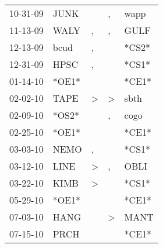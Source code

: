 \begin{supertabular}{p{0.07\textwidth}p{0.06\textwidth}p{0.02\textwidth}p{0.02\textwidth}p{0.06\textwidth}}
          10-31-09\textsuperscript{} &           JUNK\textsuperscript{} &                  &                , &           wapp\textsuperscript{} \\
          11-13-09\textsuperscript{} &           WALY\textsuperscript{} &                , &                , &           GULF\textsuperscript{} \\
          12-13-09\textsuperscript{} &           bcud\textsuperscript{} &                , &                  &                            *CS2* \\
          12-31-09\textsuperscript{} &           HPSC\textsuperscript{} &                , &                  &                            *CS1* \\
          01-14-10\textsuperscript{} &                            *OE1* &                  &                  &                            *CE1* \\
          02-02-10\textsuperscript{} &           TAPE\textsuperscript{} &     \textgreater &     \textgreater &           sbth\textsuperscript{} \\
          02-09-10\textsuperscript{} &                            *OS2* &                  &                , &           cogo\textsuperscript{} \\
          02-25-10\textsuperscript{} &                            *OE1* &                  &                  &                            *CE1* \\
          03-03-10\textsuperscript{} &           NEMO\textsuperscript{} &                , &                  &                            *CS1* \\
          03-12-10\textsuperscript{} &           LINE\textsuperscript{} &     \textgreater &                , &           OBLI\textsuperscript{} \\
          03-22-10\textsuperscript{} &           KIMB\textsuperscript{} &     \textgreater &                  &                            *CS1* \\
          05-29-10\textsuperscript{} &                            *OE1* &                  &                  &                            *CE1* \\
          07-03-10\textsuperscript{} &           HANG\textsuperscript{} &                  &     \textgreater &           MANT\textsuperscript{} \\
          07-15-10\textsuperscript{} &           PRCH\textsuperscript{} &                  &                  &                            *CE1* \\

\end{supertabular}
